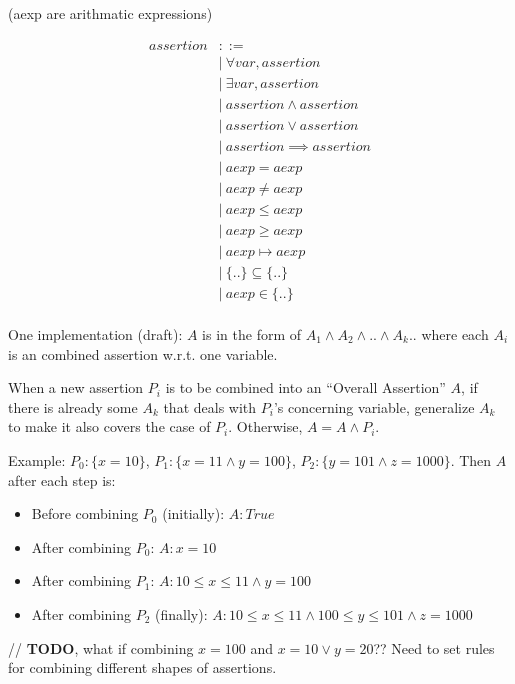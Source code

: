 \documentclass[12pt, fleqn]{article}
\begin{document}
(aexp are arithmatic expressions)

\begin{equation*}
\begin{aligned}
assertion &::=\\
&| \ \forall var, assertion\\
&| \ \exists var, assertion\\
&| \ assertion \land assertion\\
&| \ assertion \lor assertion\\
&| \ assertion \implies assertion\\
&| \ aexp = aexp\\
&| \ aexp \neq aexp\\
&| \ aexp \le aexp\\
&| \ aexp \ge aexp\\
&| \ aexp \mapsto aexp\\
&| \ \{ .. \} \subseteq \{ .. \}\\
&| \ aexp \in \{ .. \}\\
\end{aligned}
\end{equation*}

One implementation (draft): $A$ is in the form of $A_1 \land A_2 \land
.. \land A_k ..$ where each $A_i$ is an combined assertion w.r.t. one
variable.

When a new assertion $P_i$ is to be combined into an ``Overall
Assertion'' $A$, if there is already some $A_k$ that deals with
$P_i$'s concerning variable, generalize $A_k$ to make it also covers
the case of $P_i$. Otherwise, $A = A \land P_i$.

Example: $P_0: \{ x = 10 \}$, $P_1: \{ x = 11 \land y = 100\}$, $P_2: \{ y = 101 \land z = 1000 \}$. Then $A$ after each step is:

\begin{itemize}
\item Before combining $P_0$ (initially): $A: True$
\item After combining $P_0$: $A: x = 10$
\item After combining $P_1$: $A: 10 \le x \le 11 \land y = 100$
\item After combining $P_2$ (finally): $A: 10 \le x \le 11 \land 100 \le y \le 101 \land z = 1000 $
\end{itemize}

// \textbf{TODO}, what if combining $x = 100$ and $x = 10 \lor y =
20$??  Need to set rules for combining different shapes of assertions.
\end{document}
